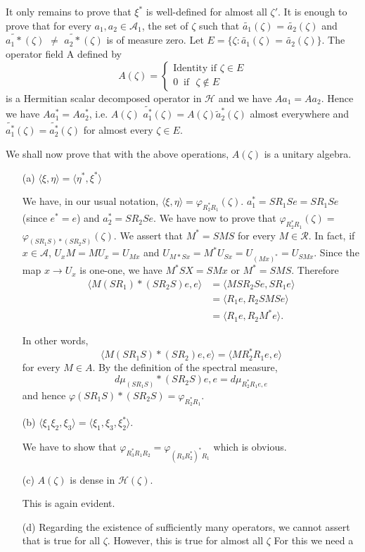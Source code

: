 It only remains to prove that $\xi^*$ is well-defined for almost
all $\zeta'$. It is enough to prove that for every $a_1, a_2 \in
\mathcal{A}_1$, the set of $\zeta$ such that $\widetilde {a_1}
(\zeta)$ = $\widetilde{a_2} (\zeta)$ and $\widetilde {a_1*} (\zeta)$
$\neq$ $\widetilde {a_2*} (\zeta)$ is of measure zero. Let $E =  \{
\zeta : \widetilde {a_1} (\zeta)$ = $\widetilde {a_2} (\zeta) \}
$. The operator field A defined by 
$$ 
A(\zeta) = 
\begin{cases} 
\text{Identity if } \zeta \in E \\ 0
  ~\text{ if~ } \zeta \notin E 
\end{cases} 
$$
is a Hermitian scalar decomposed operator in $\mathscr{H}$ and we
have $Aa_1 = Aa_2$.  
Hence we have $Aa^*_1 = Aa^*_2$, i.e. $A(\zeta)$ $\widetilde {a^*_1}
(\zeta) = A(\zeta) \widetilde a^*_2 (\zeta)$ almost everywhere and
$\widetilde{a^*_1} (\zeta) = \widetilde{a^*_2} (\zeta)$ for almost
every $\zeta \in E$. 

We shall now prove that with the above operations, $A(\zeta)$ is a
unitary algebra. 
\begin{itemize}
\item[(a)] $\langle \xi, \eta \rangle = \langle \eta^*,\xi^*  \rangle$

We have, in our usual notation, $\langle \xi, \eta \rangle =
\varphi_{R^*_2R_1} (\zeta)$. 
$a^*_1 = SR_1 Se =SR_1Se$ (since $e^* = e$) and $a^*_2 = SR_2 Se$. We
have now to prove 
that $\varphi _{R^*_2R_1} (\zeta) = $ $\varphi _{(SR_1S) *(SR_2S)}
(\zeta)$. We assert that $M^* = SMS$ for  every $M \in
\mathscr{R}$. In fact, if 
$x \in\mathcal{A}$, $U_x M = M U_x = U_{Mx}$ and $U_{M*Sx} = M^*U_{Sx} = U_{(Mx)^*}
= U_{SMx}$. Since the map $x \rightarrow U_x$ is one-one, we have
$M^*SX = SMx$ or $M^* = SMS$. Therefore 
\begin{align*}
\langle  M (SR_1) * (SR_2 S)e, e \rangle &=  \langle MSR_2Se,  SR_1e
  \rangle\\
&=  \langle R_1e, R_2 SMSe \rangle\\ 
& = \langle R_1e, R_2 M^*e  \rangle. 
\end{align*}

In other words, 
$$
\langle M(SR_1 S) * (SR_2)e,e \rangle = \langle M R^*_2 R_1e,e \rangle
$$
for every $M \in A$. By the definition of the spectral measure,
$$
d \mu _{(SR_1S)}*(SR_2S)e,e = d \mu _{R^*_2 R_1 e,e}  
$$\pageoriginale 
and hence $\varphi (SR_1S)*(SR_2S)  = \varphi _{R_2^* R_1}$. 

\item[(b)] $\langle \xi_1 \xi _2, \xi _3 \rangle = \langle \xi_1,
  \xi_3, \xi^*_2 \rangle$.   

We have to show that $\varphi_{R^*_3 R_1 R_2} = \varphi_{(R_3
  R^*_2)^*R_1}$  which is obvious.   

\item[(c)] $A(\zeta)$ is dense in $\mathscr{H}(\zeta)$. 

This is again evident.
 
\item[(d)] Regarding the existence of sufficiently many operators, we cannot
 assert that is true for all $\zeta$. However, this is true for almost
 all $\zeta$ For this we need a  
\end{itemize}

